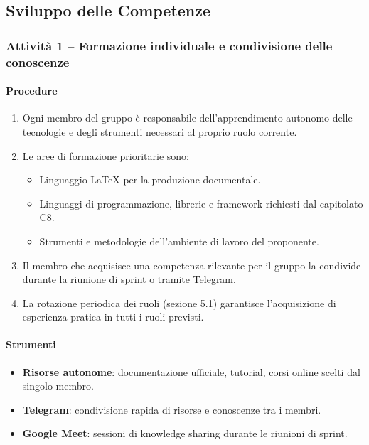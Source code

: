 \documentclass[a4paper, 11pt, oneside]{scrartcl}
\begin{document}
\subsection{Sviluppo delle Competenze}

\subsubsection{Attività 1 – Formazione individuale e condivisione delle conoscenze}

\paragraph{Procedure}
\begin{enumerate}
    \item Ogni membro del gruppo è responsabile dell'apprendimento autonomo delle tecnologie e degli strumenti necessari al proprio ruolo corrente.
    \item Le aree di formazione prioritarie sono:
    \begin{itemize}
        \item Linguaggio \LaTeX{} per la produzione documentale.
        \item Linguaggi di programmazione, librerie e framework richiesti dal capitolato C8.
        \item Strumenti e metodologie dell'ambiente di lavoro del proponente.
    \end{itemize}
    \item Il membro che acquisisce una competenza rilevante per il gruppo la condivide durante la riunione di sprint o tramite Telegram.
    \item La rotazione periodica dei ruoli (sezione 5.1) garantisce l'acquisizione di esperienza pratica in tutti i ruoli previsti.
\end{enumerate}

\paragraph{Strumenti}
\begin{itemize}
    \item \textbf{Risorse autonome}: documentazione ufficiale, tutorial, corsi online scelti dal singolo membro.
    \item \textbf{Telegram}: condivisione rapida di risorse e conoscenze tra i membri.
    \item \textbf{Google Meet}: sessioni di knowledge sharing durante le riunioni di sprint.
\end{itemize}
\end{document}
